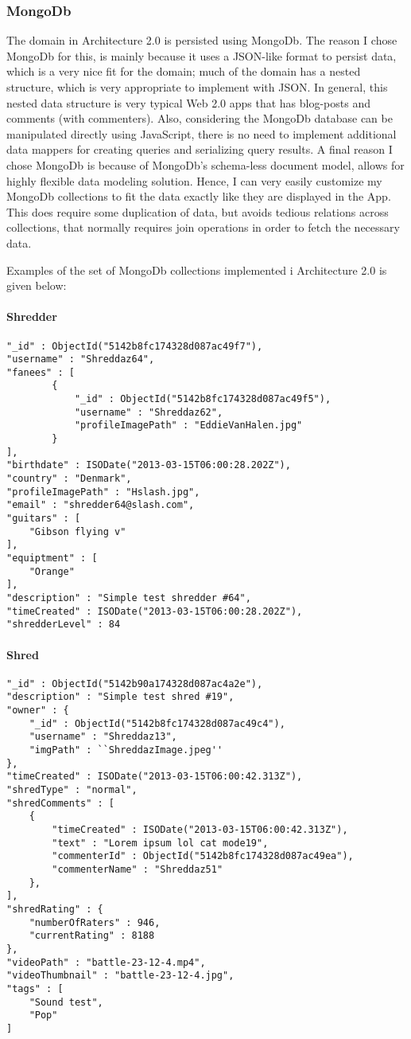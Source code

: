 \subsubsection{MongoDb}
The domain in Architecture 2.0 is persisted using MongoDb. The reason I chose MongoDb for this, is mainly because it uses a JSON-like format to persist data, which is a very nice fit for the domain; much of the domain has a nested structure, which is very appropriate to implement with JSON. In general, this nested data structure is very typical Web 2.0 apps that has blog-posts and comments (with commenters). Also, considering the MongoDb database can be manipulated directly using JavaScript, there is no need to implement additional data mappers for creating queries and serializing query results. A final reason I chose MongoDb is because of MongoDb's schema-less document model, allows for highly flexible data modeling solution. Hence, I can very easily customize my MongoDb collections to fit the data exactly like they are displayed in the App. This does require some duplication of data, but avoids tedious relations across collections, that normally requires join operations in order to fetch the necessary data.

Examples of the set of MongoDb collections implemented i Architecture 2.0 is given below:
\paragraph{Shredder}
\begin{lstlisting}
"_id" : ObjectId("5142b8fc174328d087ac49f7"),
"username" : "Shreddaz64",
"fanees" : [
		{
			"_id" : ObjectId("5142b8fc174328d087ac49f5"),
			"username" : "Shreddaz62",
			"profileImagePath" : "EddieVanHalen.jpg"
		}
],
"birthdate" : ISODate("2013-03-15T06:00:28.202Z"),
"country" : "Denmark",
"profileImagePath" : "Hslash.jpg",
"email" : "shredder64@slash.com",
"guitars" : [
	"Gibson flying v"
],
"equiptment" : [
	"Orange"
],
"description" : "Simple test shredder #64",
"timeCreated" : ISODate("2013-03-15T06:00:28.202Z"),
"shredderLevel" : 84
\end{lstlisting}

\paragraph{Shred}
\begin{lstlisting}
"_id" : ObjectId("5142b90a174328d087ac4a2e"),
"description" : "Simple test shred #19",
"owner" : {
	"_id" : ObjectId("5142b8fc174328d087ac49c4"),
	"username" : "Shreddaz13",
	"imgPath" : ``ShreddazImage.jpeg''
},
"timeCreated" : ISODate("2013-03-15T06:00:42.313Z"),
"shredType" : "normal",
"shredComments" : [
	{
		"timeCreated" : ISODate("2013-03-15T06:00:42.313Z"),
		"text" : "Lorem ipsum lol cat mode19",
		"commenterId" : ObjectId("5142b8fc174328d087ac49ea"),
		"commenterName" : "Shreddaz51"
	},
],
"shredRating" : {
	"numberOfRaters" : 946,
	"currentRating" : 8188
},
"videoPath" : "battle-23-12-4.mp4",
"videoThumbnail" : "battle-23-12-4.jpg",
"tags" : [
	"Sound test",
	"Pop"
]
\end{lstlisting}

